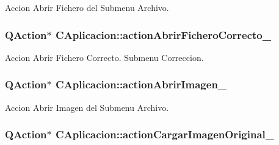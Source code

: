 Accion Abrir Fichero del Submenu Archivo. 

\subsubsection[{\texorpdfstring{action\+Abrir\+Fichero\+Correcto\+\_\+}{actionAbrirFicheroCorrecto_}}]{\setlength{\rightskip}{0pt plus 5cm}Q\+Action$\ast$ C\+Aplicacion\+::action\+Abrir\+Fichero\+Correcto\+\_\+\hspace{0.3cm}{\ttfamily [private]}}\hypertarget{classCAplicacion_abd9f33aa366727875ab9c798e1a4695c}{}\label{classCAplicacion_abd9f33aa366727875ab9c798e1a4695c}


Accion Abrir Fichero Correcto. Submenu Correccion. 

\subsubsection[{\texorpdfstring{action\+Abrir\+Imagen\+\_\+}{actionAbrirImagen_}}]{\setlength{\rightskip}{0pt plus 5cm}Q\+Action$\ast$ C\+Aplicacion\+::action\+Abrir\+Imagen\+\_\+\hspace{0.3cm}{\ttfamily [private]}}\hypertarget{classCAplicacion_ac7f0a3871355c19d02bf87f36322cee7}{}\label{classCAplicacion_ac7f0a3871355c19d02bf87f36322cee7}


Accion Abrir Imagen del Submenu Archivo. 

\subsubsection[{\texorpdfstring{action\+Cargar\+Imagen\+Original\+\_\+}{actionCargarImagenOriginal_}}]{\setlength{\rightskip}{0pt plus 5cm}Q\+Action$\ast$ C\+Aplicacion\+::action\+Cargar\+Imagen\+Original\+\_\+\hspace{0.3cm}{\ttfamily [private]}}\hypertarget{classCAplicacion_a3768f71b55ac5e2d77fed775d8ebce74}{}\label{classCAplicacion_a3768f71b55ac5e2d77fed775d8ebce74}


